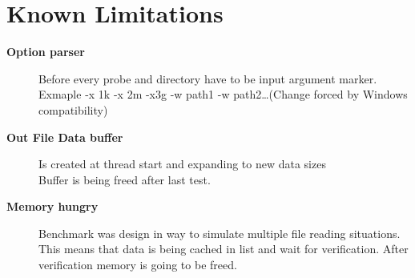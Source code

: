 \hypertarget{KnownLimitations}{
\section{Known Limitations}
\label{KnownLimitations}
}

\begin{description}
\item [\textbf{Option parser}] Before every probe and directory have to be input argument marker.\\Exmaple -x 1k -x 2m -x3g -w path1 -w path2\ldots (Change forced by Windows compatibility)
\item [\textbf{Out File Data buffer}] Is created at thread start and expanding to new data sizes\\ Buffer is being freed after last test.
\item [\textbf{Memory hungry} ] Benchmark was design in way to simulate multiple file reading situations.\\
This means that data is being cached in list and wait for verification. After verification memory is going to be freed.
\end{description}
